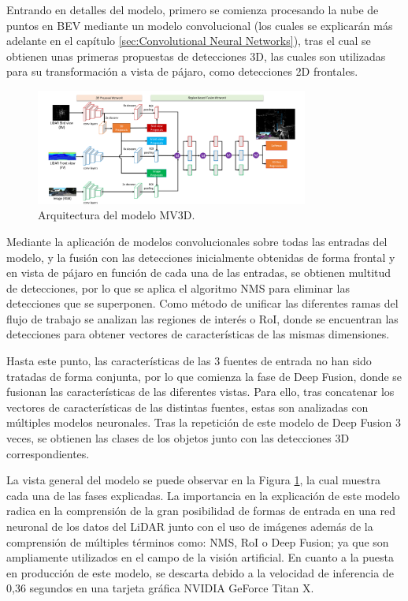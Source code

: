 Entrando en detalles del modelo, primero se comienza procesando la nube de puntos en \ac{BEV} mediante un modelo convolucional (los cuales se explicarán más adelante en el capítulo \ref{sec:Convolutional Neural Networks}), tras el cual se obtienen unas primeras propuestas de detecciones 3D, las cuales son utilizadas para su transformación a vista de pájaro, como detecciones 2D frontales.

\begin{figure}[H]
    \centering
    \includegraphics[width=0.8\textwidth]{Book/figures/2_estado_arte/MV3D.png}
    \caption{Arquitectura del modelo MV3D.}
    \label{fig:Arquitectura del modelo MV3D.}
\end{figure}

Mediante la aplicación de modelos convolucionales sobre todas las entradas del modelo, y la fusión con las detecciones inicialmente obtenidas de forma frontal y en vista de pájaro en función de cada una de las entradas, se obtienen multitud de detecciones, por lo que se aplica el algoritmo \ac{NMS} para eliminar las detecciones que se superponen. Como método de unificar las diferentes ramas del flujo de trabajo se analizan las regiones de interés o \ac{RoI}, donde se encuentran las detecciones para obtener vectores de características de las mismas dimensiones.

Hasta este punto, las características de las 3 fuentes de entrada no han sido tratadas de forma conjunta, por lo que comienza la fase de Deep Fusion, donde se fusionan las características de las diferentes vistas. Para ello, tras concatenar los vectores de características de las distintas fuentes, estas son analizadas con múltiples modelos neuronales. Tras la repetición de este modelo de Deep Fusion 3 veces, se obtienen las clases de los objetos junto con las detecciones 3D correspondientes.

La vista general del modelo se puede observar en la Figura \ref{fig:Arquitectura del modelo MV3D.}, la cual muestra cada una de las fases explicadas. La importancia en la explicación de este modelo radica en la comprensión de la gran posibilidad de formas de entrada en una red neuronal de los datos del \ac{LiDAR} junto con el uso de imágenes además de la comprensión de múltiples términos como: \ac{NMS}, \ac{RoI} o Deep Fusion; ya que son ampliamente utilizados en el campo de la visión artificial. En cuanto a la puesta en producción de este modelo, se descarta debido a la velocidad de inferencia de 0,36 segundos en una tarjeta gráfica NVIDIA GeForce Titan X.

